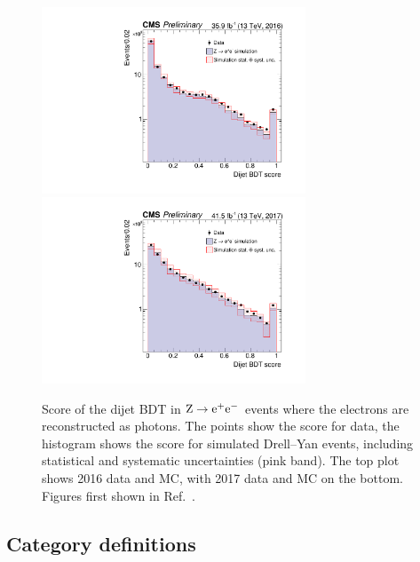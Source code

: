\begin{figure}[hptb]
  \centering
  \includegraphics[width=0.7\textwidth]{Figures/Categorisation/DijetBDT_2016.pdf}
  \includegraphics[width=0.7\textwidth]{Figures/Categorisation/DijetBDT_2017.pdf}
  \caption[Validation of the dijet BDT in \Zee events.]
  {
    Score of the dijet BDT in $\mathrm{Z}\rightarrow{\mathrm{e}^{+}\mathrm{e}^{-}}$
    events where the electrons are reconstructed as photons.
    The points show the score for data, the histogram shows
    the score for simulated Drell--Yan events, including statistical and 
    systematic uncertainties (pink band).
    The top plot shows 2016 data and MC,
    with 2017 data and MC on the bottom.
    Figures first shown in Ref.~\cite{HIG-18-029}.
  }
  \label{fig:cat_dijetBDT}
\end{figure}

\subsection{Category definitions}

